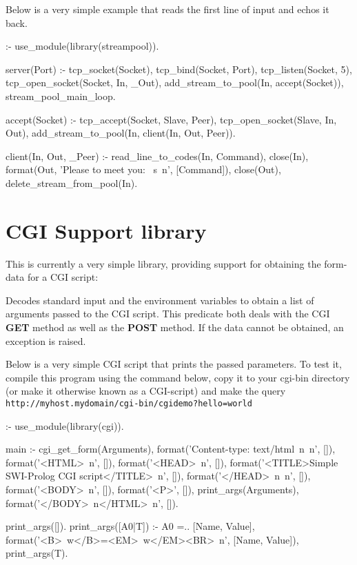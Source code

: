 \documentclass[11pt]{article}
\begin{document}
Below is a very simple example that reads the first line of input and
echos it back.

\begin{code}
:- use_module(library(streampool)).

server(Port) :-
        tcp_socket(Socket),
        tcp_bind(Socket, Port),
        tcp_listen(Socket, 5),
        tcp_open_socket(Socket, In, _Out),
        add_stream_to_pool(In, accept(Socket)),
        stream_pool_main_loop.

accept(Socket) :-
        tcp_accept(Socket, Slave, Peer),
        tcp_open_socket(Slave, In, Out),
        add_stream_to_pool(In, client(In, Out, Peer)).

client(In, Out, _Peer) :-
        read_line_to_codes(In, Command),
        close(In),
        format(Out, 'Please to meet you: ~s~n', [Command]),
        close(Out),
        delete_stream_from_pool(In).
\end{code}

\noindent
\section{CGI Support library}

This is currently a very simple library, providing support for obtaining
the form-data for a CGI script:

\begin{description}
Decodes standard input and the environment variables to obtain a list
of arguments passed to the CGI script.  This predicate both deals with
the CGI {\bf GET} method as well as the {\bf POST} method.  If the
data cannot be obtained, an  exception is
raised.
\end{description}

Below is a very simple CGI script that prints the passed parameters.
To test it, compile this program using the command below, copy it to
your cgi-bin directory (or make it otherwise known as a CGI-script) and
make the query \verb$http://myhost.mydomain/cgi-bin/cgidemo?hello=world$

\begin{code}
\end{code}

\noindent
\begin{code}
:- use_module(library(cgi)).

main :-
        cgi_get_form(Arguments),
        format('Content-type: text/html~n~n', []),
        format('<HTML>~n', []),
        format('<HEAD>~n', []),
        format('<TITLE>Simple SWI-Prolog CGI script</TITLE>~n', []),
        format('</HEAD>~n~n', []),
        format('<BODY>~n', []),
        format('<P>', []),
        print_args(Arguments),
        format('</BODY>~n</HTML>~n', []).

print_args([]).
print_args([A0|T]) :-
        A0 =.. [Name, Value],
        format('<B>~w</B>=<EM>~w</EM><BR>~n', [Name, Value]),
        print_args(T).
\end{code}
\end{document}
